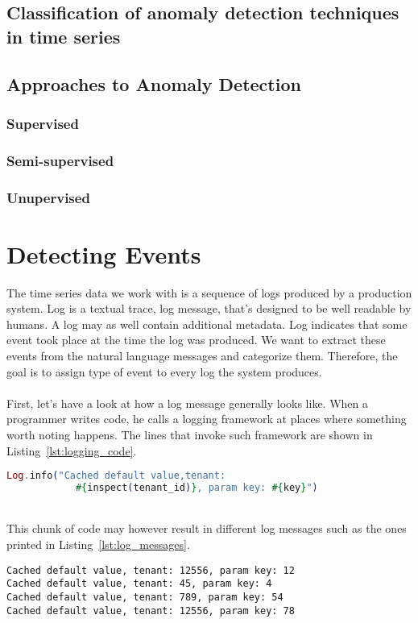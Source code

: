 \subsection{Classification of anomaly detection techniques in time series}


\subsection{Approaches to Anomaly Detection}
    \subsubsection{Supervised}
    \subsubsection{Semi-supervised}
    \subsubsection{Unupervised}
    
\newpage

\section{Detecting Events}
The time series data we work with is a sequence of logs produced by a production system. 
Log is a textual trace, log message, that's designed to be well readable by humans. A log may as well contain additional metadata.
Log indicates that some event took place at the time the log was produced. We want to extract these events from the natural language messages and categorize them.
Therefore, the goal is to assign type of event to every log the system produces.\\
\\
First, let's have a look at how a log message generally looks like.
When a programmer writes code, he calls a logging framework at places where something worth noting happens. The lines that invoke such framework are shown in Listing~\ref{lst:logging_code}.
\\
\begin{lstlisting}[language=elixir, caption={Example of how logging is done in source code}, captionpos=b, label={lst:logging_code}]
Log.info("Cached default value,tenant: 
            #{inspect(tenant_id)}, param key: #{key}")
\end{lstlisting}
\\
This chunk of code may however result in different log messages such as the ones printed in Listing~\ref{lst:log_messages}.
\\
\begin{lstlisting}[label={lst:log_messages}, caption={Possible outputs of the code in Listing~\ref{lst:logging_code}}, captionpos=b]
Cached default value, tenant: 12556, param key: 12
Cached default value, tenant: 45, param key: 4
Cached default value, tenant: 789, param key: 54
Cached default value, tenant: 12556, param key: 78
\end{lstlisting}

